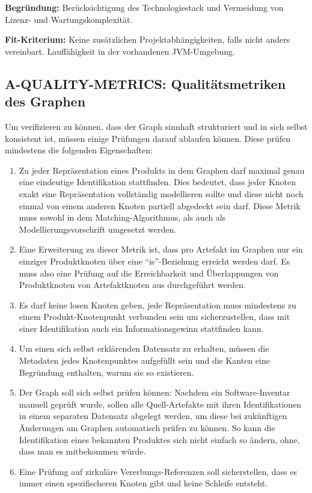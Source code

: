 \textbf{Begründung:}
Berücksichtigung des Technologiestack und Vermeidung von Lizenz- und Wartungskomplexität.

\textbf{Fit-Kriterium:}
Keine zusätzlichen Projektabhängigkeiten, falls nicht anders vereinbart.
Lauffähigkeit in der vorhandenen JVM-Umgebung.

\subsection{A-QUALITY-METRICS: Qualitätsmetriken des Graphen}\label{subsec:req-graph-inner-consistency}

Um verifizieren zu können, dass der Graph sinnhaft strukturiert und in sich selbst konsistent ist, müssen einige Prüfungen darauf ablaufen können.
Diese prüfen mindestens die folgenden Eigenschaften:

\begin{enumerate}
    \item Zu jeder Repräsentation eines Produkts in dem Graphen darf maximal genau eine eindeutige Identifikation stattfinden.
    Dies bedeutet, dass jeder Knoten exakt eine Repräsentation vollständig modellieren sollte und diese nicht noch einmal von einem anderen Knoten partiell abgedeckt sein darf.
    Diese Metrik muss sowohl in dem Matching-Algorithmus, als auch als Modellierungsvorschrift umgesetzt werden.
    \item Eine Erweiterung zu dieser Metrik ist, dass pro Artefakt im Graphen nur ein einziger Produktknoten über eine \enquote{is}-Beziehung erreicht werden darf.
    Es muss also eine Prüfung auf die Erreichbarkeit und Überlappungen von Produktknoten von Artefaktknoten aus durchgeführt werden.
    \item Es darf keine losen Knoten geben, jede Repräsentation muss mindestens zu einem Produkt-Knotenpunkt verbunden sein um sicherzustellen, dass mit einer Identifikation auch ein Informationsgewinn stattfinden kann.
    \item Um einen sich selbst erklärenden Datensatz zu erhalten, müssen die Metadaten jedes Knotenpunktes aufgefüllt sein und die Kanten eine Begründung enthalten, warum sie so existieren.
    \item Der Graph soll sich selbst prüfen können: Nachdem ein Software-Inventar manuell geprüft wurde, sollen alle Quell-Artefakte mit ihren Identifikationen in einem separaten Datensatz abgelegt werden, um diese bei zukünftigen Änderungen am Graphen automatisch prüfen zu können.
    So kann die Identifikation eines bekannten Produktes sich nicht einfach so ändern, ohne, dass man es mitbekommen würde.
    \item Eine Prüfung auf zirkuläre Vererbungs-Referenzen soll sicherstellen, dass es immer einen spezifischeren Knoten gibt und keine Schleife entsteht.
\end{enumerate}
